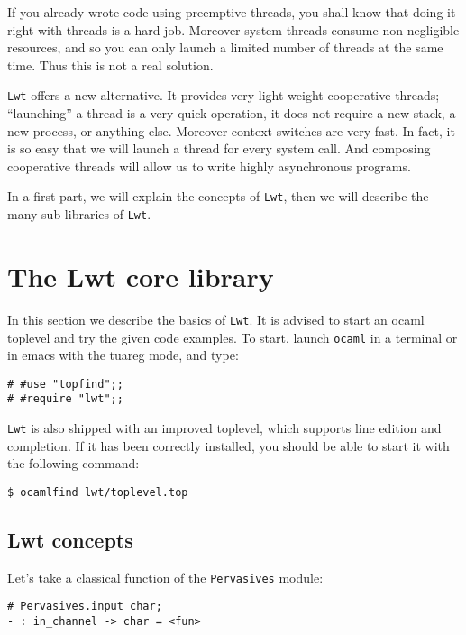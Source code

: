 \documentclass{article}
\newcommand{\lwt}{\texttt{Lwt}\xspace}
\begin{document}
If you already wrote code using preemptive threads, you shall know
that doing it right with threads is a hard job. Moreover system
threads consume non negligible resources, and so you can only launch a
limited number of threads at the same time. Thus this is not a real
solution.

\lwt offers a new alternative. It provides very light-weight
cooperative threads; ``launching'' a thread is a very quick operation,
it does not require a new stack, a new process, or anything
else. Moreover context switches are very fast. In fact, it is so easy
that we will launch a thread for every system call. And composing
cooperative threads will allow us to write highly asynchronous
programs.

In a first part, we will explain the concepts of \lwt, then we will
describe the many sub-libraries of \lwt.

\section{The Lwt core library}

In this section we describe the basics of \lwt. It is advised to start
an ocaml toplevel and try the given code examples. To start, launch
\texttt{ocaml} in a terminal or in emacs with the tuareg mode, and
type:

\begin{verbatim}
# #use "topfind";;
# #require "lwt";;
\end{verbatim}

\lwt is also shipped with an improved toplevel, which supports line
edition and completion. If it has been correctly installed, you should
be able to start it with the following command:

\begin{verbatim}
$ ocamlfind lwt/toplevel.top
\end{verbatim}

\subsection{Lwt concepts}

Let's take a classical function of the \texttt{Pervasives} module:

\begin{verbatim}
# Pervasives.input_char;
- : in_channel -> char = <fun>
\end{verbatim}
\end{document}
